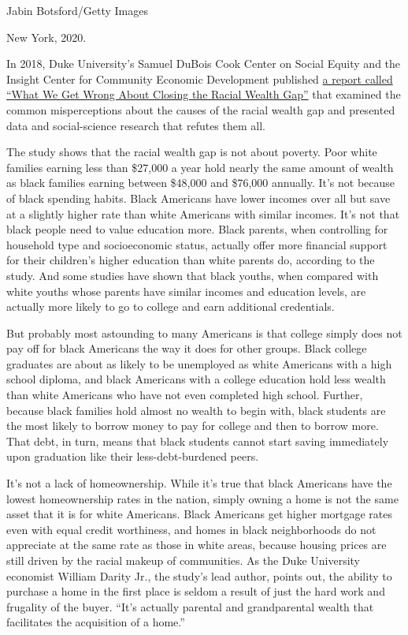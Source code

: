 Jabin Botsford/Getty Images

New York, 2020.

In 2018, Duke University's Samuel DuBois Cook Center on Social Equity
and the Insight Center for Community Economic Development published
\href{https://socialequity.duke.edu/wp-content/uploads/2019/10/what-we-get-wrong.pdf}{a
report called ``What We Get Wrong About Closing the Racial Wealth Gap''}
that examined the common misperceptions about the causes of the racial
wealth gap and presented data and social-science research that refutes
them all.

The study shows that the racial wealth gap is not about poverty. Poor
white families earning less than \$27,000 a year hold nearly the same
amount of wealth as black families earning between \$48,000 and \$76,000
annually. It's not because of black spending habits. Black Americans
have lower incomes over all but save at a slightly higher rate than
white Americans with similar incomes. It's not that black people need to
value education more. Black parents, when controlling for household type
and socioeconomic status, actually offer more financial support for
their children's higher education than white parents do, according to
the study. And some studies have shown that black youths, when compared
with white youths whose parents have similar incomes and education
levels, are actually more likely to go to college and earn additional
credentials.

But probably most astounding to many Americans is that college simply
does not pay off for black Americans the way it does for other groups.
Black college graduates are about as likely to be unemployed as white
Americans with a high school diploma, and black Americans with a college
education hold less wealth than white Americans who have not even
completed high school. Further, because black families hold almost no
wealth to begin with, black students are the most likely to borrow money
to pay for college and then to borrow more. That debt, in turn, means
that black students cannot start saving immediately upon graduation like
their less-debt-burdened peers.

It's not a lack of homeownership. While it's true that black Americans
have the lowest homeownership rates in the nation, simply owning a home
is not the same asset that it is for white Americans. Black Americans
get higher mortgage rates even with equal credit worthiness, and homes
in black neighborhoods do not appreciate at the same rate as those in
white areas, because housing prices are still driven by the racial
makeup of communities. As the Duke University economist William Darity
Jr., the study's lead author, points out, the ability to purchase a home
in the first place is seldom a result of just the hard work and
frugality of the buyer. ``It's actually parental and grandparental
wealth that facilitates the acquisition of a home.''

